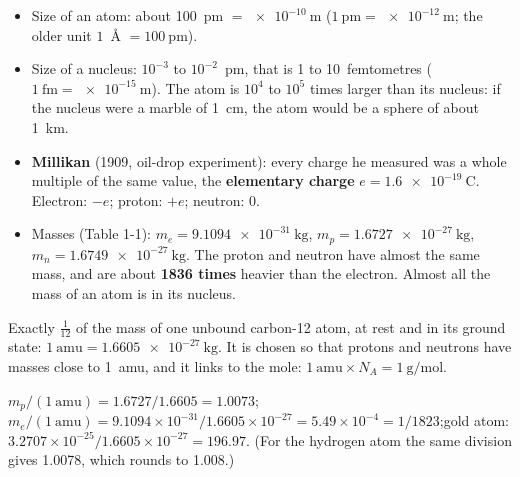 \begin{itemize}
  \item Size of an atom: about \SI{100}{\pico\metre} $= \SI{e-10}{\metre}$ ($1\ \mathrm{pm} =
        \SI{e-12}{\metre}$; the older unit $1$~\AA{} $= \SI{100}{\pico\metre}$).
  \item Size of a nucleus: $10^{-3}$ to $10^{-2}$~pm, that is 1 to 10~femtometres
        ($1\ \mathrm{fm} = \SI{e-15}{\metre}$). The atom is $10^4$ to $10^5$ times larger than its nucleus:
        if the nucleus were a marble of 1~cm, the atom would be a sphere of about 1~km.
  \item \textbf{Millikan} (1909, oil-drop experiment): every charge he measured was a whole multiple of
        the same value, the \textbf{elementary charge} $e = \SI{1.6e-19}{\coulomb}$. Electron: $-e$;
        proton: $+e$; neutron: 0.
  \item Masses (Table 1-1): $m_e = \SI{9.1094e-31}{\kilo\gram}$, $m_p = \SI{1.6727e-27}{\kilo\gram}$,
        $m_n = \SI{1.6749e-27}{\kilo\gram}$. The proton and neutron have almost the same mass, and are
        about \textbf{1836 times} heavier than the electron. Almost all the mass of an atom is in its nucleus.
\end{itemize}
\begin{concept}
Exactly $\frac1{12}$ of the mass of one unbound carbon-12 atom, at rest and in its ground state:
$1\ \mathrm{amu} = \SI{1.6605e-27}{\kilo\gram}$. It is chosen so that protons and neutrons have
masses close to 1~amu, and it links to the mole: $1\ \mathrm{amu}\times N_A = \SI{1}{\gram\per\mole}$.
\end{concept}
\begin{worked}
$m_p/(1\ \mathrm{amu}) = 1.6727/1.6605 = 1.0073$;\quad $m_e/(1\ \mathrm{amu}) = 9.1094\times10^{-31}/1.6605\times10^{-27}
= 5.49\times10^{-4} = 1/1823$;\quad gold atom: $3.2707\times10^{-25}/1.6605\times10^{-27} = 196.97$.
(For the hydrogen atom the same division gives 1.0078, which rounds to 1.008.)
\end{worked}

